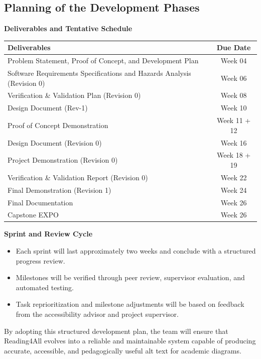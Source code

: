 \documentclass[12pt]{article}
\begin{document}
\subsection{Planning of the Development Phases}

\textbf{Deliverables and Tentative Schedule}

\begin{center}
  \begin{tabularx}{\textwidth}{Xc}
    \toprule
    \textbf{Deliverables} & \textbf{Due Date} \\
    \midrule
    Problem Statement, Proof of Concept, and Development Plan & Week  04 \\
    Software Requirements Specifications and Hazards Analysis (Revision 0) & Week 06 \\
    Verification \& Validation Plan (Revision 0) & Week 08 \\
    Design Document (Rev-1) & Week 10 \\
    Proof of Concept Demonstration & Week 11 + 12 \\
    Design Document (Revision 0) & Week 16 \\
    Project Demonstration (Revision 0) & Week 18 + 19 \\
    Verification \& Validation Report (Revision 0) & Week 22 \\
    Final Demonstration (Revision 1) & Week 24 \\
    Final Documentation & Week 26 \\
    Capstone EXPO & Week 26 \\
    \bottomrule
  \end{tabularx}
\end{center}

\textbf{Sprint and Review Cycle}

\begin{itemize}
    \item Each sprint will last approximately two weeks and conclude with a structured progress review.  
    \item Milestones will be verified through peer review, supervisor evaluation, and automated testing.  
    \item Task reprioritization and milestone adjustments will be based on feedback from the accessibility advisor and project supervisor.  
\end{itemize}

\noindent By adopting this structured development plan, the team will ensure
that Reading4All evolves into a reliable and maintainable system
capable of producing accurate, accessible, and pedagogically useful
alt text for academic diagrams.
\end{document}
